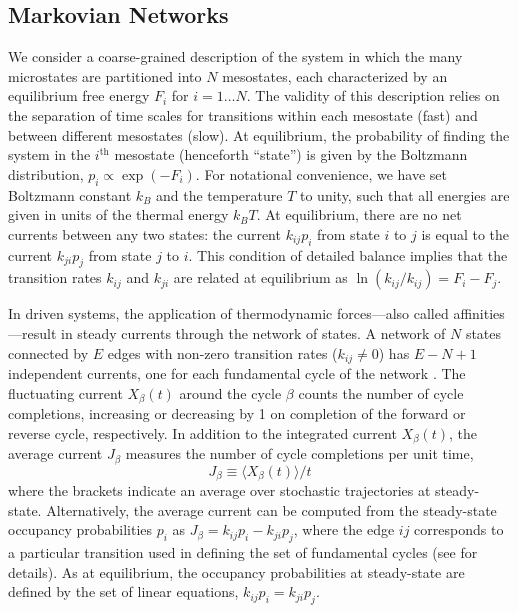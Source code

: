 \begin{appendices}
\subsection{Markovian Networks}

We consider a coarse-grained description of the system in which the many microstates are partitioned into $N$ mesostates, each characterized by an equilibrium free energy $F_i$ for $i=1\dots N$.  The validity of this description relies on the separation of time scales for transitions within each mesostate (fast) and between different mesostates (slow).  At equilibrium, the probability of finding the system in the $i^{\text{th}}$ mesostate (henceforth ``state'') is given by the Boltzmann distribution, $p_i \propto \exp(-F_i)$. For notational convenience, we have set Boltzmann constant $k_B$ and the temperature $T$ to unity, such that all energies are given in units of the thermal energy $k_B T$.  At equilibrium, there are no net currents between any two states: the current $k_{ij} p_i$ from state $i$ to $j$ is equal to the current $k_{ji} p_j$ from state $j$ to $i$.  This condition of detailed balance implies that the transition rates $k_{ij}$ and $k_{ji}$ are related  at equilibrium as $\ln(k_{ij}/k_{ij})=F_i-F_j$. 

In driven systems, the application of thermodynamic forces---also called affinities---result in steady currents through the network of states.  A network of $N$ states connected by $E$ edges with non-zero transition rates ($k_{ij}\neq 0$) has $E-N+1$ independent currents, one for each fundamental cycle of the network \autocite{schnakenberg1976network}.  The fluctuating current $X_{\beta}(t)$ around the cycle $\beta$ counts the number of cycle completions, increasing or decreasing by 1 on completion of the forward or reverse cycle, respectively.  In addition to the integrated current $X_{\beta}(t)$, the average current $J_{\beta}$ measures the number of cycle completions per unit time,
\begin{equation}
    J_{\beta} \equiv \langle X_{\beta}(t)\rangle / t
\end{equation}
where the brackets indicate an average over stochastic trajectories at steady-state.  Alternatively, the average current can be computed from the steady-state occupancy probabilities $p_i$ as $J_{\beta} = k_{ij} p_i - k_{ji} p_j$, where the edge $ij$ corresponds to a particular transition used in defining the set of fundamental cycles (see \autocite{schnakenberg1976network} for details).  As at equilibrium, the occupancy probabilities at steady-state are defined by the set of linear equations, $k_{ij} p_i = k_{ji} p_j$.


\end{appendices}
